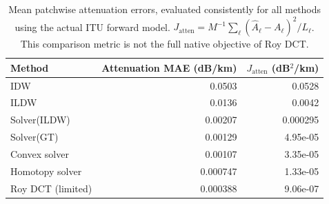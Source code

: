 \begin{table}[H]
\centering\small
\begin{tabular}{lrr}
\toprule
Method & Attenuation MAE (dB/km) & $J_{\mathrm{atten}}$ (dB$^2$/km) \\
\midrule
IDW & 0.0503 & 0.0528 \\
ILDW & 0.0136 & 0.0042 \\
Solver(ILDW) & 0.00207 & 0.000295 \\
Solver(GT) & 0.00129 & 4.95e-05 \\
Convex solver & 0.00107 & 3.35e-05 \\
Homotopy solver & 0.000747 & 1.33e-05 \\
Roy DCT (limited) & 0.000388 & 9.06e-07 \\
\bottomrule
\end{tabular}
\caption{Mean patchwise attenuation errors, evaluated consistently for all methods using the actual ITU forward model. $J_{\mathrm{atten}}=M^{-1}\sum_\ell(\widehat A_\ell-A_\ell)^2/L_\ell$. This comparison metric is not the full native objective of Roy DCT.}
\label{tab:attenuation-fit-summary}
\end{table}